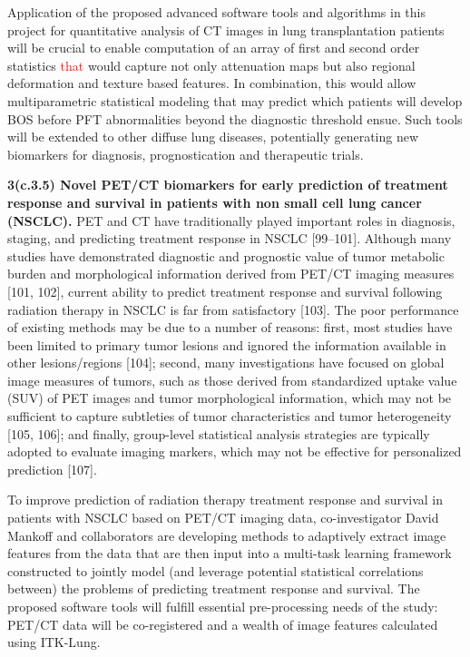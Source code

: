 \documentclass[11pt,]{article}
\begin{document}
Application of the proposed advanced software tools and algorithms in
this project for quantitative analysis of CT images in lung
transplantation patients will be crucial to enable computation of an
array of first and second order statistics \textcolor{red}{that} would
capture not only attenuation maps but also regional deformation and
texture based features. In combination, this would allow multiparametric
statistical modeling that may predict which patients will develop BOS
before PFT abnormalities beyond the diagnostic threshold ensue. Such
tools will be extended to other diffuse lung diseases, potentially
generating new biomarkers for diagnosis, prognostication and therapeutic
trials.

\textbf{3(c.3.5) Novel PET/CT biomarkers for early prediction of
treatment response and survival in patients with non small cell lung
cancer (NSCLC).} PET and CT have traditionally played important roles in
diagnosis, staging, and predicting treatment response in NSCLC
{[}99--101{]}. Although many studies have demonstrated diagnostic and
prognostic value of tumor metabolic burden and morphological information
derived from PET/CT imaging measures {[}101, 102{]}, current ability to
predict treatment response and survival following radiation therapy in
NSCLC is far from satisfactory {[}103{]}. The poor performance of
existing methods may be due to a number of reasons: first, most studies
have been limited to primary tumor lesions and ignored the information
available in other lesions/regions {[}104{]}; second, many
investigations have focused on global image measures of tumors, such as
those derived from standardized uptake value (SUV) of PET images and
tumor morphological information, which may not be sufficient to capture
subtleties of tumor characteristics and tumor heterogeneity {[}105,
106{]}; and finally, group-level statistical analysis strategies are
typically adopted to evaluate imaging markers, which may not be
effective for personalized prediction {[}107{]}.

To improve prediction of radiation therapy treatment response and
survival in patients with NSCLC based on PET/CT imaging data,
co-investigator David Mankoff and collaborators are developing methods
to adaptively extract image features from the data that are then input
into a multi-task learning framework constructed to jointly model (and
leverage potential statistical correlations between) the problems of
predicting treatment response and survival. The proposed software tools
will fulfill essential pre-processing needs of the study: PET/CT data
will be co-registered and a wealth of image features calculated using
ITK-Lung.
\end{document}
